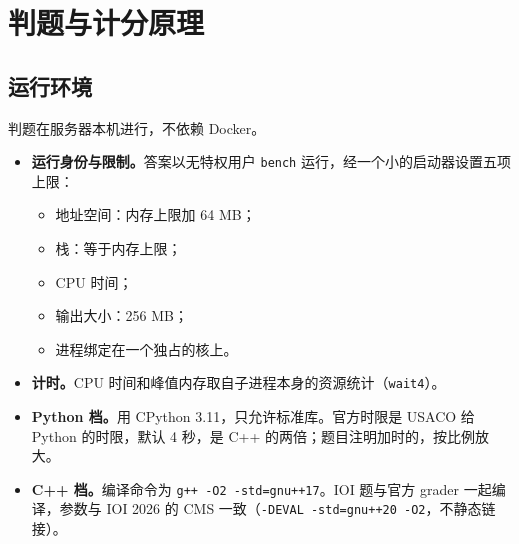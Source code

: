 \documentclass[11pt,a4paper,fontset=none]{ctexart}
\begin{document}
\section{判题与计分原理}
\subsection{运行环境}
判题在服务器本机进行，不依赖 Docker。
\begin{itemize}
  \item \textbf{运行身份与限制。}答案以无特权用户 \texttt{bench} 运行，经一个小的启动器设置五项上限：
    \begin{itemize}
      \item 地址空间：内存上限加 64 MB；
      \item 栈：等于内存上限；
      \item CPU 时间；
      \item 输出大小：256 MB；
      \item 进程绑定在一个独占的核上。
    \end{itemize}
  \item \textbf{计时。}CPU 时间和峰值内存取自子进程本身的资源统计（\texttt{wait4}）。
  \item \textbf{Python 档。}用 CPython 3.11，只允许标准库。官方时限是 USACO 给 Python 的时限，默认 4 秒，是 C++ 的两倍；题目注明加时的，按比例放大。
  \item \textbf{C++ 档。}编译命令为 \texttt{g++ -O2 -std=gnu++17}。IOI 题与官方 grader 一起编译，参数与 IOI 2026 的 CMS 一致（\texttt{-DEVAL -std=gnu++20 -O2}，不静态链接）。
\end{itemize}
\end{document}

